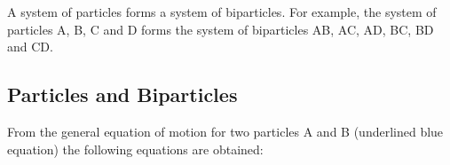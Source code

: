 \documentclass[10pt]{article}
\begin{document}
\medskip

\par A system of particles forms a system of biparticles. For example, the system of particles A, B, C and D forms the system of biparticles AB, AC, AD, BC, BD and CD.

\newpage

{\centering\subsection*{Particles and Biparticles}}

\vspace{+0.6em}

\par From the general equation of motion for two particles A and B (underlined blue equation) the following equations are obtained:

\vspace{+1.8em}
\end{document}
